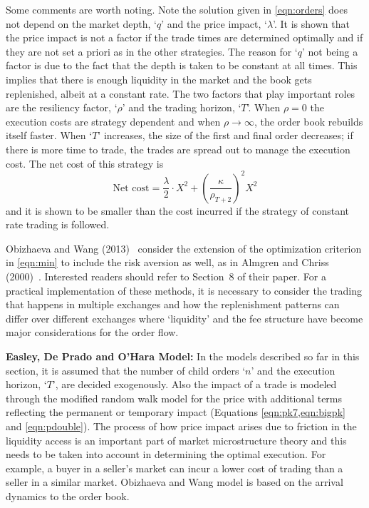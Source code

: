Some comments are worth noting. Note the solution given in \eqref{eqn:orders} does not depend on the market depth, `$q$' and the price impact, `$\lambda$'. It is shown that the price impact is not a factor if the trade times are determined optimally and if they are not set a priori as in the other strategies. The reason for `$q$' not being a factor is due to the fact that the depth is taken to be constant at all times. This implies that there is enough liquidity in the market and the book gets replenished, albeit at a constant rate. The two factors that play important roles are the resiliency factor, `$\rho$' and the trading horizon, `$T$'. When $\rho=0$ the execution costs are strategy dependent and when $\rho \to \infty$, the order book rebuilds itself faster. When `$T$' increases, the size of the first and final order decreases; if there is more time to trade, the trades are spread out to manage the execution cost. The net cost of this strategy is
	\begin{equation}\label{eqn:netcost}
	\text{Net cost}=\dfrac{\lambda}{2} \cdot X^2 + \left(\dfrac{\kappa}{\rho_{T+2}}\right)^2 X^2
	\end{equation}
and it is shown to be smaller than the cost incurred if the strategy of constant rate trading is followed. 


Obizhaeva and Wang (2013)~\cite{obizhaeva} consider the extension of the optimization criterion in \eqref{eqn:min} to include the risk aversion as well, as in Almgren and Chriss (2000)~\cite{alm2000}. Interested readers should refer to Section~8 of their paper. For a practical implementation of these methods, it is necessary to consider the trading that happens in multiple exchanges and how the replenishment patterns can differ over different exchanges where `liquidity' and the fee structure have become major considerations for the order flow. \twomedskip


\noindent\textbf{Easley, De Prado and O'Hara Model:} In the models described so far in this section, it is assumed that the number of child orders `$n$' and the execution horizon, `$T$', are decided exogenously. Also the impact of a trade is modeled through the modified random walk model for the price with additional terms reflecting the permanent or temporary impact (Equations \ref{eqn:pk7,eqn:bigpk} and \ref{eqn:pdouble}). The process of how price impact arises due to friction in the liquidity access is an important part of market microstructure theory and this needs to be taken into account in determining the optimal execution. For example, a buyer in a seller's market can incur a lower cost of trading than a seller in a similar market. Obizhaeva and Wang model is based on the arrival dynamics to the order book. 


